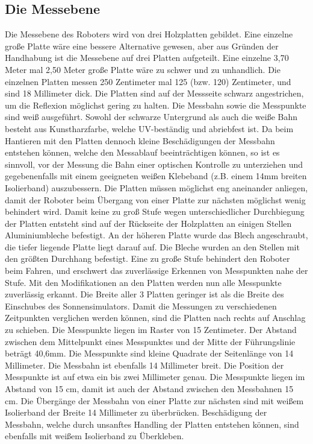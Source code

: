 \documentclass[a4paper,bibtotoc,oneside]{scrbook}
\begin{document}
\subsection{Die Messebene}\thispagestyle{empty}
Die Messebene des Roboters wird von drei Holzplatten gebildet. Eine einzelne große Platte wäre eine bessere Alternative gewesen, aber aus Gründen der Handhabung ist die Messebene auf drei Platten aufgeteilt. Eine einzelne 3,70 Meter mal 2,50 Meter große Platte wäre zu schwer und zu unhandlich. Die einzelnen Platten messen 250 Zentimeter mal 125 (bzw. 120) Zentimeter, und sind 18 Millimeter dick.
Die Platten sind auf der Messseite schwarz angestrichen, um die Reflexion möglichst gering zu halten. Die Messbahn sowie die Messpunkte sind weiß ausgeführt. Sowohl der schwarze Untergrund als auch die weiße Bahn besteht aus Kunstharzfarbe, welche UV-beständig und abriebfest ist. Da beim Hantieren mit den Platten dennoch kleine Beschädigungen der Messbahn entstehen können, welche den Messablauf beeinträchtigen können, so ist es sinnvoll, vor der Messung die Bahn einer optischen Kontrolle zu unterziehen und gegebenenfalls mit einem geeigneten weißen Klebeband (z.B. einem 14mm breiten Isolierband) auszubessern.
Die Platten müssen möglichst eng aneinander anliegen, damit der Roboter beim Übergang von einer Platte zur nächsten möglichst wenig behindert wird. Damit keine zu groß Stufe wegen unterschiedlicher Durchbiegung der Platten entsteht sind auf der Rückseite der Holzplatten an einigen Stellen Aluminiumbleche befestigt. An der höheren Platte wurde das Blech angeschraubt, die tiefer liegende Platte liegt darauf auf. Die Bleche wurden an den Stellen mit den größten Durchhang befestigt.
Eine zu große Stufe behindert den Roboter beim Fahren, und erschwert das zuverlässige Erkennen von Messpunkten nahe der Stufe. Mit den Modifikationen an den Platten werden nun alle Messpunkte zuverlässig erkannt.
Die Breite aller 3 Platten geringer ist als die Breite des Einschubes des Sonnensimulators. Damit die Messungen zu verschiedenen Zeitpunkten verglichen werden können, sind die Platten nach rechts auf Anschlag zu schieben.
Die Messpunkte liegen im Raster von 15 Zentimeter. Der Abstand zwischen dem Mittelpunkt eines Messpunktes und der Mitte der Führungslinie beträgt 40,6mm. Die Messpunkte sind kleine Quadrate der Seitenlänge von 14 Millimeter. Die Messbahn ist ebenfalls 14 Millimeter breit. Die Position der Messpunkte ist auf etwa ein bis zwei Millimeter genau.
Die Messpunkte liegen im Abstand von 15 cm, damit ist auch der Abstand zwischen den Messbahnen 15 cm. Die Übergänge der Messbahn von einer Platte zur nächsten sind mit weißem Isolierband  der Breite 14 Millimeter zu überbrücken. Beschädigung der Messbahn, welche durch unsanftes Handling der Platten entstehen können, sind ebenfalls mit weißem Isolierband zu Überkleben.
\end{document}
